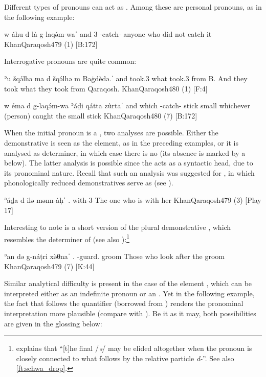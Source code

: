 Different types of pronouns can act as \prims. Among these are personal pronouns, as in the following example: 

{w\cb{} áhu d\cb{} là g-laqə́m-waˈ}
{and\cb{} 3\masc{} \lnk\cb{} \neg{} \ind-catch-\pst}
{anyone who did not catch it}
{KhanQaraqosh}{479 (1) {[B:172]}}

Interrogative pronouns are quite common:

{ʾu\cb{} šqə́lhə ma\cb{} d\cb{} šqə́lhə m\cb{} Baġdèdə.ˈ}
{and\cb{} took.3\pl{} what\cb{} \lnk\cb{} took.3\pl{} from\cb{} B.}
{And they took what they took from Qaraqosh.}
{KhanQaraqosh}{480 (1) {[F:4]}}

{w\cb{} éma d\cb{} g-laqə́m-wa ʾáḏi qátta zùrtaˈ}
{and\cb{} which \lnk\cb{} \ind-catch-\pst{} \dem{} stick small}
{whichever (person) caught the small stick}
{KhanQaraqosh}{480 (7) {[B:172]}}



When the initial pronoun is a , two analyses are possible. Either the demonstrative is seen as the \prim element, as in the preceding examples, or it is  analysed as determiner, in which case there is no \prim (its absence is marked by a \zero below). The latter analysis is possible since the \lnk* acts as a syntactic head, due to its pronominal nature. Recall that such an analysis was suggested for \JZax, in which phonologically reduced demonstratives serve as  (see ).

{ʾáḏa \opt\zero{} d\cb{} ilə mənn-àḥˈ}
{\dem.\masc{} \opt\zero{} \lnk\cb{} \cop{} with-3\fem{}}
{The one who is with her}
{KhanQaraqosh}{479 (3) {[Play 17]}}\antipar 
\newpage

Interesting to note is a short version of the plural demonstrative , which resembles the determiner of \JZax (see also ):\footnote{\citet[82]{KhanQaraqosh} explains that \enquote{[t]he final /\textit{ə}/ may be elided altogether when the pronoun is closely connected to what follows by the relative particle \textit{d-}}. See also \vref{ft:schwa_drop}.}

{ʾan \opt\zero{} də\cb{} g-náṭri xə̀θnaˈ}
{\dem.\pl{} \opt\zero{} \lnk\cb{} \ind-guard.\pl{} groom}
{Those who look after the groom}
{KhanQaraqosh}{479 (7) {[K:44]}}

Similar analytical difficulty is present in the case of the element , which can be interpreted either as an indefinite pronoun or an . Yet in the following example, the fact that  follows the quantifier  (borrowed from ) renders the pronominal interpretation more plausible (compare with \JZax {}). Be it as it may, both possibilities are given in the glossing below:

